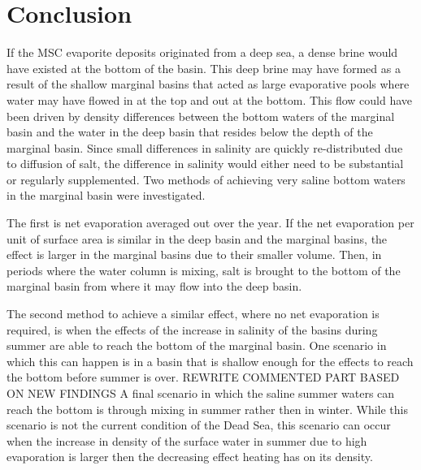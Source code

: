 \documentclass[twocolumn]{article}
\begin{document}
\section{Conclusion}
If the MSC evaporite deposits originated from a deep sea, a dense brine would have existed at the bottom of the basin. This deep brine may have formed as a result of the shallow marginal basins that acted as large evaporative pools where water may have flowed in at the top and out at the bottom. This flow could have been driven by density differences between the bottom waters of the marginal basin and the water in the deep basin that resides below the depth of the marginal basin. Since small differences in salinity are quickly re-distributed due to diffusion of salt, the difference in salinity would either need to be substantial or regularly supplemented. Two methods of achieving very saline bottom waters in the marginal basin were investigated. 

The first is net evaporation averaged out over the year. If the net evaporation per unit of surface area is similar in the deep basin and the marginal basins, the effect is larger in the marginal basins due to their smaller volume. Then, in periods where the water column is mixing, salt is brought to the bottom of the marginal basin from where it may flow into the deep basin. 

The second method to achieve a similar effect, where no net evaporation is required, is when the effects of the increase in salinity of the basins during summer are able to reach the bottom of the marginal basin. One scenario in which this can happen is in a basin that is shallow enough for the effects to reach the bottom before summer is over. REWRITE COMMENTED PART BASED ON NEW FINDINGS%
A final scenario in which the saline summer waters can reach the bottom is through mixing in summer rather then in winter. While this scenario is not the current condition of the Dead Sea, this scenario can occur when the increase in density of the surface water in summer due to high evaporation is larger then the decreasing effect heating has on its density.
\end{document}
